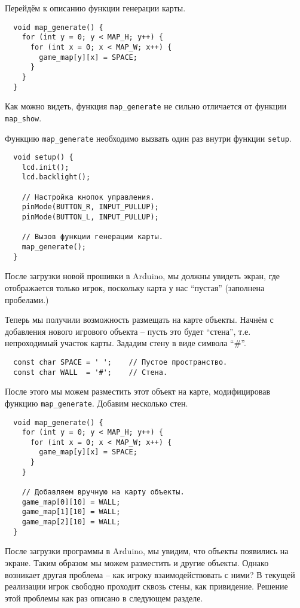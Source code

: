 \documentclass[../sparc.tex]{subfiles}
\begin{document}
Перейдём к описанию функции генерации карты.

\begin{verbatim}
  void map_generate() {
    for (int y = 0; y < MAP_H; y++) {
      for (int x = 0; x < MAP_W; x++) {
        game_map[y][x] = SPACE;
      }
    }
  }
\end{verbatim}

Как можно видеть, функция \texttt{map\_generate} не сильно отличается от функции
\texttt{map\_show}.

Функцию \texttt{map\_generate} необходимо вызвать один раз внутри функции
\texttt{setup}.

\begin{verbatim}
  void setup() {
    lcd.init();
    lcd.backlight();

    // Настройка кнопок управления.
    pinMode(BUTTON_R, INPUT_PULLUP);
    pinMode(BUTTON_L, INPUT_PULLUP);

    // Вызов функции генерации карты.
    map_generate();
  }
\end{verbatim}

После загрузки новой прошивки в Arduino, мы должны увидеть экран, где
отображается только игрок, поскольку карта у нас ``пустая'' (заполнена
пробелами.)

Теперь мы получили возможность размещать на карте объекты.  Начнём с добавления
нового игрового объекта -- пусть это будет ``стена'', т.е. непроходимый участок
карты.  Зададим стену в виде символа ``\#''.

\begin{verbatim}
  const char SPACE = ' ';    // Пустое пространство.
  const char WALL  = '#';    // Стена.
\end{verbatim}

После этого мы можем разместить этот объект на карте, модифицировав функцию
\texttt{map\_generate}.  Добавим несколько стен.

\begin{verbatim}
  void map_generate() {
    for (int y = 0; y < MAP_H; y++) {
      for (int x = 0; x < MAP_W; x++) {
        game_map[y][x] = SPACE;
      }
    }

    // Добавляем вручную на карту объекты.
    game_map[0][10] = WALL;
    game_map[1][10] = WALL;
    game_map[2][10] = WALL;
  }
\end{verbatim}

После загрузки программы в Arduino, мы увидим, что объекты появились на экране.
Таким образом мы можем разместить и другие объекты.  Однако возникает другая
проблема -- как игроку взаимодействовать с ними?  В текущей реализации игрок
свободно проходит сквозь стены, как привидение.  Решение этой проблемы как раз
описано в следующем разделе.
\end{document}
